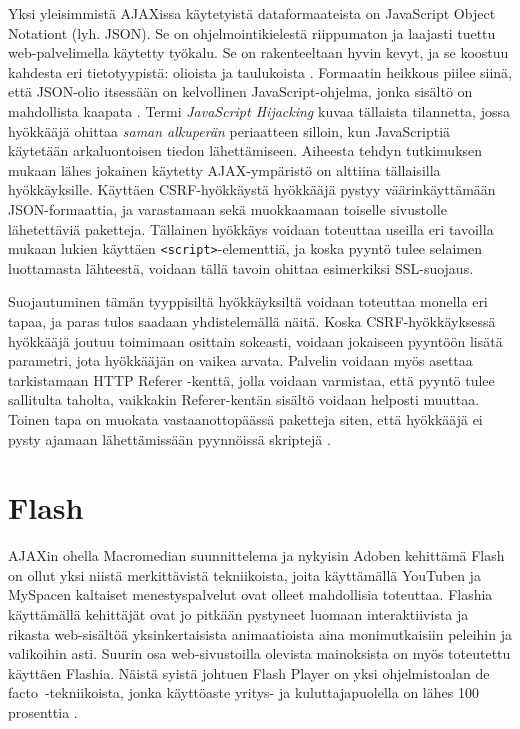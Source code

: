 Yksi yleisimmistä AJAXissa käytetyistä dataformaateista on JavaScript Object Notationt (lyh. JSON). Se on ohjelmointikielestä riippumaton ja laajasti tuettu web-palvelimella käytetty 
työkalu. Se on rakenteeltaan hyvin kevyt, ja se koostuu kahdesta eri tietotyypistä: olioista ja taulukoista \cite{JSON}. Formaatin heikkous piilee siinä, että JSON-olio itsessään on kelvollinen 
JavaScript-ohjelma, jonka sisältö on mahdollista kaapata \cite{AJAX}. Termi \emph{JavaScript Hijacking} kuvaa tällaista tilannetta, jossa hyökkääjä ohittaa \emph{saman alkuperän} periaatteen 
silloin, kun JavaScriptiä käytetään arkaluontoisen tiedon lähettämiseen. Aiheesta tehdyn tutkimuksen \cite{JSH} mukaan lähes jokainen käytetty AJAX-ympäristö on alttiina tällaisilla hyökkäyksille.
Käyttäen CSRF-hyökkäystä hyökkääjä pystyy väärinkäyttämään JSON-formaattia, ja varastamaan sekä muokkaamaan toiselle sivustolle lähetettäviä paketteja.  Tällainen hyökkäys voidaan toteuttaa 
useilla eri tavoilla mukaan lukien käyttäen \texttt{<script>}-elementtiä, ja koska pyyntö tulee selaimen luottamasta lähteestä, voidaan tällä tavoin ohittaa esimerkiksi SSL-suojaus\cite{AJAX}.

Suojautuminen tämän tyyppisiltä hyökkäyksiltä voidaan toteuttaa monella eri tapaa, ja paras tulos saadaan yhdistelemällä näitä. Koska CSRF-hyökkäyksessä hyökkääjä joutuu toimimaan osittain 
sokeasti, voidaan jokaiseen pyyntöön lisätä parametri, jota hyökkääjän on vaikea arvata. Palvelin voidaan myös asettaa tarkistamaan HTTP Referer -kenttä, jolla voidaan varmistaa, että pyyntö 
tulee sallitulta taholta, vaikkakin Referer-kentän sisältö voidaan helposti muuttaa. Toinen tapa on muokata vastaanottopäässä paketteja siten, että hyökkääjä ei pysty ajamaan lähettämissään 
pyynnöissä skriptejä 
\cite{JSH}.

\section{Flash}

AJAXin ohella Macromedian suunnittelema ja nykyisin Adoben kehittämä Flash on ollut yksi niistä merkittävistä tekniikoista, joita käyttämällä YouTuben ja MySpacen kaltaiset 
menestyspalvelut ovat olleet mahdollisia toteuttaa. Flashia käyttämällä kehittäjät ovat jo pitkään pystyneet luomaan interaktiivista ja rikasta web-sisältöä
yksinkertaisista animaatioista aina monimutkaisiin peleihin ja valikoihin asti. Suurin osa web-sivustoilla olevista mainoksista on myös toteutettu käyttäen Flashia. Näistä syistä johtuen 
Flash Player on yksi ohjelmistoalan de facto~-tekniikoista, jonka käyttöaste yritys- ja kuluttajapuolella on lähes 100 prosenttia \cite{Flash}.

